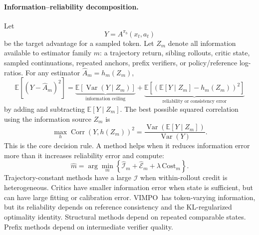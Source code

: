 \documentclass[11pt]{article}
\newcommand{\vimpo}{\textsc{VIMPO}}
\newcommand{\E}{\mathbb{E}}
\begin{document}
\paragraph{Information--reliability decomposition.}
Let
\begin{equation}
  Y=A^{\pi_b}(x_t,a_t)
\end{equation}
be the target advantage for a sampled token. Let $Z_m$ denote all information
available to estimator family $m$: a trajectory return, sibling rollouts,
critic state, sampled continuations, repeated anchors, prefix verifiers, or
policy/reference log-ratios. For any estimator
$\widehat A_m=h_m(Z_m)$,
\begin{equation}
\boxed{
\E[(Y-\widehat A_m)^2]
=
\underbrace{\E[\operatorname{Var}(Y\mid Z_m)]}_{\text{information ceiling}}
+
\underbrace{\E[(\E[Y\mid Z_m]-h_m(Z_m))^2]}_{\text{reliability or consistency error}}
}
\end{equation}
by adding and subtracting $\E[Y\mid Z_m]$. The best possible squared
correlation using the information source $Z_m$ is
\begin{equation}
\max_h \operatorname{Corr}(Y,h(Z_m))^2
=
\frac{\operatorname{Var}(\E[Y\mid Z_m])}{\operatorname{Var}(Y)} .
\end{equation}
This is the core decision rule. A method helps when it reduces information
error more than it increases reliability error and compute:
\begin{equation}
\widehat m =
\arg\min_m
\left\{
\widehat{\mathcal I}_m
+
\widehat{\mathcal E}_m
+
\lambda\,\mathrm{Cost}_m
\right\}.
\end{equation}
Trajectory-constant methods have a large $\widehat{\mathcal I}$ when
within-rollout credit is heterogeneous. Critics have smaller information error
when state is sufficient, but can have large fitting or calibration error.
\vimpo\ has token-varying information, but its reliability depends on
reference consistency and the KL-regularized optimality identity. Structural
methods depend on repeated comparable states. Prefix methods depend on
intermediate verifier quality.
\end{document}
